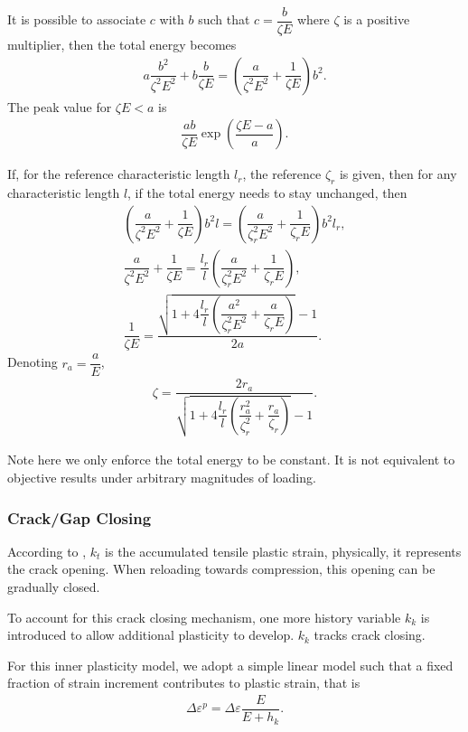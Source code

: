 It is possible to associate $c$ with $b$ such that $c=\dfrac{b}{\zeta{}E}$ where $\zeta$ is a positive multiplier, then the total energy becomes
\begin{gather}
a\dfrac{b^2}{\zeta^2E^2}+b\dfrac{b}{\zeta{}E}=\left(\dfrac{a}{\zeta^2E^2}+\dfrac{1}{\zeta{}E}\right)b^2.
\end{gather}
The peak value for $\zeta{}E<a$ is
\begin{gather}
\dfrac{ab}{\zeta{}E}\exp\left(\dfrac{\zeta{}E-a}{a}\right).
\end{gather}

If, for the reference characteristic length $l_r$, the reference $\zeta_r$ is given, then for any characteristic length $l$, if the total energy needs to stay unchanged, then
\begin{gather}
\left(\dfrac{a}{\zeta^2E^2}+\dfrac{1}{\zeta{}E}\right)b^2l=\left(\dfrac{a}{\zeta_r^2E^2}+\dfrac{1}{\zeta_r{}E}\right)b^2l_r,\\
\dfrac{a}{\zeta^2E^2}+\dfrac{1}{\zeta{}E}=\dfrac{l_r}{l}\left(\dfrac{a}{\zeta_r^2E^2}+\dfrac{1}{\zeta_r{}E}\right),\\
\dfrac{1}{\zeta{}E}=\dfrac{\sqrt{1+4\dfrac{l_r}{l}\left(\dfrac{a^2}{\zeta_r^2E^2}+\dfrac{a}{\zeta_r{}E}\right)}-1}{2a}.
\end{gather}
Denoting $r_a=\dfrac{a}{E}$,
\begin{gather}
\zeta=\dfrac{2r_a}{\sqrt{1+4\dfrac{l_r}{l}\left(\dfrac{r_a^2}{\zeta_r^2}+\dfrac{r_a}{\zeta_r}\right)}-1}.
\end{gather}

Note here we only enforce the total energy to be constant. It is not equivalent to objective results under arbitrary magnitudes of loading.
\subsubsection{Crack/Gap Closing}
According to , $k_t$ is the accumulated tensile plastic strain, physically, it represents the crack opening. When reloading towards compression, this opening can be gradually closed.

To account for this crack closing mechanism, one more history variable $k_k$ is introduced to allow additional plasticity to develop. $k_k$ tracks crack closing.

For this inner plasticity model, we adopt a simple linear model such that a fixed fraction of strain increment contributes to plastic strain, that is
\begin{gather}
\Delta\varepsilon^p=\Delta\varepsilon\dfrac{E}{E+h_k}.
\end{gather}

